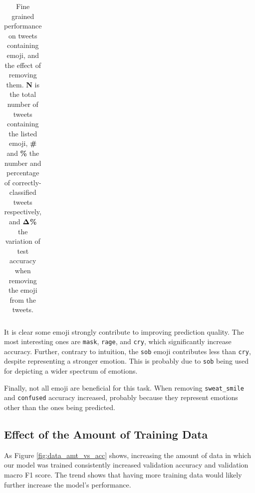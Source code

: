 \documentclass[11pt,a4paper]{article}
\begin{document}
\begin{table}[!h]
\begin{tabular}{lr|rc|rc|r}
        \end{tabular}


    \caption{Fine grained performance on tweets containing emoji, and the effect of removing them. \textbf{N} is the total number of tweets containing the listed emoji, \textbf{\#} and \textbf{\%} the number and percentage of correctly-classified tweets respectively, and $\bf{\Delta}$\textbf{\%} the variation of test accuracy when removing the emoji from the tweets.}

    \label{table:emoji_fine_grained}

\end{table}

It is clear some emoji strongly contribute to improving prediction quality. The most interesting ones are \texttt{mask}, \texttt{rage}, and \texttt{cry}, which significantly increase accuracy. Further, contrary to intuition, the \texttt{sob} emoji contributes less than \texttt{cry}, despite representing a stronger emotion. This is probably due to \texttt{sob} being used for depicting a wider spectrum of emotions.

Finally, not all emoji are beneficial for this task. When removing \texttt{sweat\_smile} and \texttt{confused} accuracy increased, probably because they represent emotions other than the ones being predicted.



\subsection{Effect of the Amount of Training Data}

As Figure \ref{fig:data_amt_vs_acc} shows, increasing the amount of data in which our model was trained consistently increased validation accuracy and validation macro F1 score. The trend shows that having more training data would likely further increase the model's performance.
\end{document}
